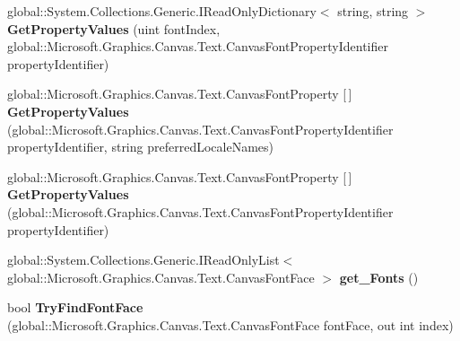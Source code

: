 \begin{DoxyCompactItemize}
\item 
\mbox{\label{interface_microsoft_1_1_graphics_1_1_canvas_1_1_text_1_1_i_canvas_font_set_a2a80bf73d063c25da9b75f227e594ff8}} 
global\+::\+System.\+Collections.\+Generic.\+I\+Read\+Only\+Dictionary$<$ string, string $>$ {\bfseries Get\+Property\+Values} (uint font\+Index, global\+::\+Microsoft.\+Graphics.\+Canvas.\+Text.\+Canvas\+Font\+Property\+Identifier property\+Identifier)
\item 
\mbox{\label{interface_microsoft_1_1_graphics_1_1_canvas_1_1_text_1_1_i_canvas_font_set_a8b18fb74693b3e6e70b6e7d5f9d95d79}} 
global\+::\+Microsoft.\+Graphics.\+Canvas.\+Text.\+Canvas\+Font\+Property \mbox{[}$\,$\mbox{]} {\bfseries Get\+Property\+Values} (global\+::\+Microsoft.\+Graphics.\+Canvas.\+Text.\+Canvas\+Font\+Property\+Identifier property\+Identifier, string preferred\+Locale\+Names)
\item 
\mbox{\label{interface_microsoft_1_1_graphics_1_1_canvas_1_1_text_1_1_i_canvas_font_set_a02fa760e9e493370176b87152cad6b1e}} 
global\+::\+Microsoft.\+Graphics.\+Canvas.\+Text.\+Canvas\+Font\+Property \mbox{[}$\,$\mbox{]} {\bfseries Get\+Property\+Values} (global\+::\+Microsoft.\+Graphics.\+Canvas.\+Text.\+Canvas\+Font\+Property\+Identifier property\+Identifier)
\item 
\mbox{\label{interface_microsoft_1_1_graphics_1_1_canvas_1_1_text_1_1_i_canvas_font_set_a3127f9ceaa2e85c1d6dc30f5eae2eb02}} 
global\+::\+System.\+Collections.\+Generic.\+I\+Read\+Only\+List$<$ global\+::\+Microsoft.\+Graphics.\+Canvas.\+Text.\+Canvas\+Font\+Face $>$ {\bfseries get\+\_\+\+Fonts} ()
\item 
\mbox{\label{interface_microsoft_1_1_graphics_1_1_canvas_1_1_text_1_1_i_canvas_font_set_aa2c30125a6ebce4c37256a8c0277ff6a}} 
bool {\bfseries Try\+Find\+Font\+Face} (global\+::\+Microsoft.\+Graphics.\+Canvas.\+Text.\+Canvas\+Font\+Face font\+Face, out int index)
\item 
\mbox{\label{interface_microsoft_1_1_graphics_1_1_canvas_1_1_text_1_1_i_canvas_font_set_a32b02ae8a2da14f8f1cfa1cc5d6002b3}} 

\end{DoxyCompactItemize}
